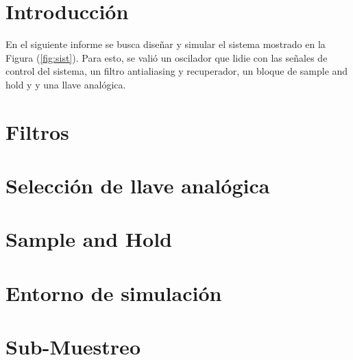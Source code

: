 







\tableofcontents
\newpage


\section{Introducción}

En el siguiente informe se busca diseñar y simular el sistema mostrado en la Figura (\ref{fig:sist}). Para esto, se valió un oscilador que lidie con las señales de control del sistema, un filtro antialiasing y recuperador, un bloque de sample and hold y y una llave analógica.

\section{Filtros}
	\label{Ejercicio-2}
	

\section{Selección de llave analógica}
	\label{Ejercicio-3}
	
	
\section{Sample and Hold}
	\label{Ejercicio-4}
	
	


\section{Entorno de simulación}
	\label{Ejercicio-5}
	
	
\section{Sub-Muestreo}
	\label{Ejercicio-8}
	
	
